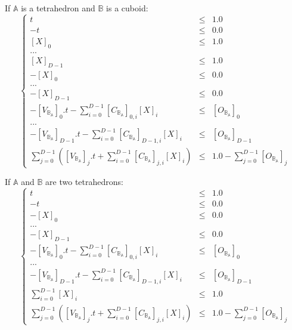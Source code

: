 \documentclass[12pt, a4paper]{article}
\begin{document}
If $\mathbb{A}$ is a tetrahedron and $\mathbb{B}$ is a cuboid:
\begin{equation}
\left\lbrace
\begin{array}{rcl}
t&\le&1.0\\
-t&\le&0.0\\
\left[X\right]_0&\le&1.0\\
...\\
\left[X\right]_{D-1}&\le&1.0\\
-\left[X\right]_0&\le&0.0\\
...\\
-\left[X\right]_{D-1}&\le&0.0\\
-\left[V_{\mathbb{B}_\mathbb{A}}\right]_0.t-\sum_{i=0}^{D-1}\left[C_{\mathbb{B}_\mathbb{A}}\right]_{0,i}\left[X\right]_i&\le&\left[O_{\mathbb{B}_\mathbb{A}}\right]_0\\
...\\
-\left[V_{\mathbb{B}_\mathbb{A}}\right]_{D-1}.t-\sum_{i=0}^{D-1}\left[C_{\mathbb{B}_\mathbb{A}}\right]_{D-1,i}\left[X\right]_i&\le&\left[O_{\mathbb{B}_\mathbb{A}}\right]_{D-1}\\
\sum_{j=0}^{D-1}\left(\left[V_{\mathbb{B}_\mathbb{A}}\right]_j.t+\sum_{i=0}^{D-1}\left[C_{\mathbb{B}_\mathbb{A}}\right]_{j,i}\left[X\right]_i\right)&\le&1.0-\sum_{j=0}^{D-1}\left[O_{\mathbb{B}_\mathbb{A}}\right]_{j}
\end{array}
\right.
\end{equation}

If $\mathbb{A}$ and $\mathbb{B}$ are two tetrahedrons:
\begin{equation}
\left\lbrace
\begin{array}{rcl}
t&\le&1.0\\
-t&\le&0.0\\
-\left[X\right]_0&\le&0.0\\
...\\
-\left[X\right]_{D-1}&\le&0.0\\
-\left[V_{\mathbb{B}_\mathbb{A}}\right]_0.t-\sum_{i=0}^{D-1}\left[C_{\mathbb{B}_\mathbb{A}}\right]_{0,i}\left[X\right]_i&\le&\left[O_{\mathbb{B}_\mathbb{A}}\right]_{0}\\
...\\
-\left[V_{\mathbb{B}_\mathbb{A}}\right]_{D-1}.t-\sum_{i=0}^{D-1}\left[C_{\mathbb{B}_\mathbb{A}}\right]_{D-1,i}\left[X\right]_i&\le&\left[O_{\mathbb{B}_\mathbb{A}}\right]_{D-1}\\
\sum_{i=0}^{D-1}\left[X\right]_i&\le&1.0\\
\sum_{j=0}^{D-1}\left(\left[V_{\mathbb{B}_\mathbb{A}}\right]_j.t+\sum_{i=0}^{D-1}\left[C_{\mathbb{B}_\mathbb{A}}\right]_{j,i}\left[X\right]_i\right)&\le&1.0-\sum_{j=0}^{D-1}\left[O_{\mathbb{B}_\mathbb{A}}\right]_{j}
\end{array}
\right.
\end{equation}
\end{document}
